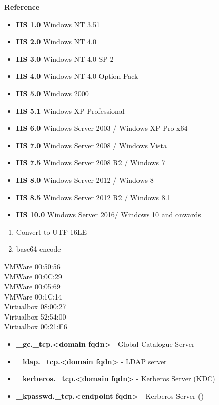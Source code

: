 \documentclass[a4paper,10pt]{article}
\begin{document}
\newpage
\Huge{\textbf{Reference}}
\newline
\normalsize
\begin{tcolorbox}[breakable,title=IIS Versions]
\begin{itemize}
	\itemsep0em
	\item \textbf{IIS 1.0} Windows NT 3.51
	\item \textbf{IIS 2.0} Windows NT 4.0
	\item \textbf{IIS 3.0} Windows NT 4.0 SP 2
	\item \textbf{IIS 4.0} Windows NT 4.0 Option Pack
	\item \textbf{IIS 5.0} Windows 2000
	\item \textbf{IIS 5.1} Windows XP Professional
	\item \textbf{IIS 6.0} Windows Server 2003 / Windows XP Pro x64
	\item \textbf{IIS 7.0} Windows Server 2008 / Windows Vista
	\item \textbf{IIS 7.5} Windows Server 2008 R2 / Windows 7
	\item \textbf{IIS 8.0} Windows Server 2012 / Windows 8
	\item \textbf{IIS 8.5} Windows Server 2012 R2 / Windows 8.1
	\item \textbf{IIS 10.0} Windows Server 2016/ Windows 10 and onwards
\end{itemize}
\end{tcolorbox}
\begin{tcolorbox}[breakable,title=Creating Powershell encoded payloads]
	\begin{enumerate}
		\itemsep0em
		\item Convert to UTF-16LE
		\item base64 encode
	\end{enumerate}
\end{tcolorbox}
\begin{tcolorbox}[breakable,title=Common MAC Address vendors]
VMWare 00:50:56\\
VMWare 00:0C:29\\
VMWare 00:05:69\\
VMWare 00:1C:14\\
Virtualbox 08:00:27	\\
Virtualbox 52:54:00 \\
Virtualbox 00:21:F6
\end{tcolorbox}
\begin{tcolorbox}[breakable,title=Active Directory SRV records]
\begin{itemize}
	\itemsep0em
	\item \textbf{\_gc.\_tcp.<domain fqdn>} - Global Catalogue Server
	\item \textbf{\_ldap.\_tcp.<domain fqdn>} - LDAP server
	\item \textbf{\_kerberos.\_tcp.<domain fqdn>} - Kerberos Server (KDC)
	\item \textbf{\_kpasswd.\_tcp.<endpoint fqdn>} - Kerberos Server ()
\end{itemize}
\end{tcolorbox}
\end{document}
